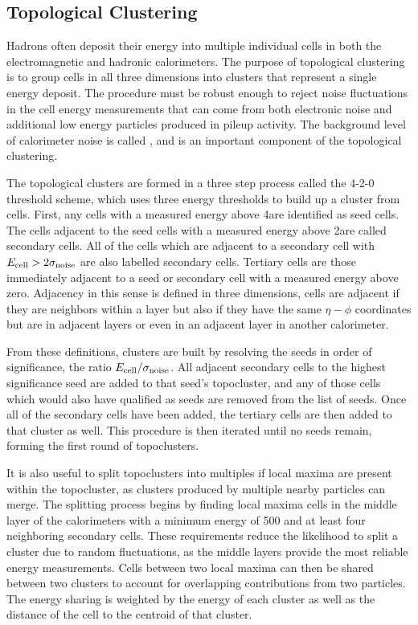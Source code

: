 \subsection{Topological Clustering}

Hadrons often deposit their energy into multiple individual cells in both the electromagnetic and hadronic calorimeters.
The purpose of topological clustering is to group cells in all three dimensions into clusters that represent a single energy deposit.
The procedure must be robust enough to reject noise fluctuations in the cell energy measurements that can come from both electronic noise and additional low energy particles produced in pileup activity.
The background level of calorimeter noise is called \signoise, and is an important component of the topological clustering.

The topological clusters are formed in a three step process called the 4-2-0 threshold scheme, which uses three energy thresholds to build up a cluster from cells.
First, any cells with a measured energy above 4\signoise are identified as seed cells. 
The cells adjacent to the seed cells with a measured energy above 2\signoise are called secondary cells.
All of the cells which are adjacent to a secondary cell with $E_\mathrm{cell} > 2\sigma_{\mathrm{noise}}$ are also labelled secondary cells.
Tertiary cells are those immediately adjacent to a seed or secondary cell with a measured energy above zero.
Adjacency in this sense is defined in three dimensions, cells are adjacent if they are neighbors within a layer but also if they have the same $\eta-\phi$ coordinates but are in adjacent layers or even in an adjacent layer in another calorimeter.

From these definitions, clusters are built by resolving the seeds in order of significance, the ratio $E_{\mathrm{cell}}/\sigma_{\mathrm{noise}}$.
All adjacent secondary cells to the highest significance seed are added to that seed's topocluster, and any of those cells which would also have qualified as seeds are removed from the list of seeds.
Once all of the secondary cells have been added, the tertiary cells are then added to that cluster as well.
This procedure is then iterated until no seeds remain, forming the first round of topoclusters.

It is also useful to split topoclusters into multiples if local maxima are present within the topocluster, as clusters produced by multiple nearby particles can merge.
The splitting process begins by finding local maxima cells in the middle layer of the calorimeters with a minimum energy of 500 \MeV and at least four neighboring secondary cells.
These requirements reduce the likelihood to split a cluster due to random fluctuations, as the middle layers provide the most reliable energy measurements.
Cells between two local maxima can then be shared between two clusters to account for overlapping contributions from two particles. The energy sharing is weighted by the energy of each cluster as well as the distance of the cell to the centroid of that cluster.

